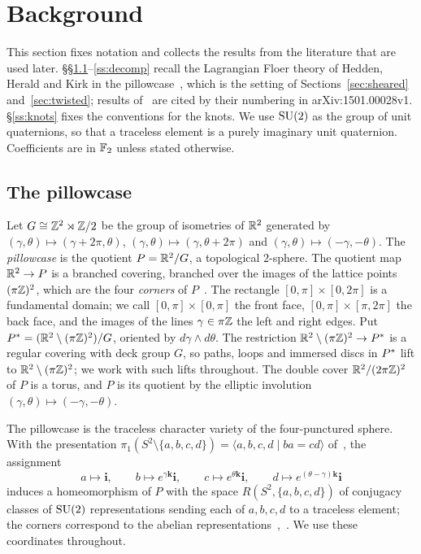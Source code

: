 \section{Background}\label{sec:background}

This section fixes notation and collects the results from the literature that are used later.
\S\S\ref{ss:pillowcase}--\ref{ss:decomp} recall the Lagrangian Floer theory of Hedden, Herald and Kirk in
the pillowcase~\cite{HHK2}, which is the setting of Sections~\ref{sec:sheared} and~\ref{sec:twisted}; results
of~\cite{HHK2} are cited by their numbering in arXiv:1501.00028v1. \S\ref{ss:knots} fixes the conventions for
the knots. We use $\mathrm{SU}(2)$ as the group of unit quaternions, so that a
traceless element is a purely imaginary unit quaternion. Coefficients are in $\mathbb{F}_2$ unless stated otherwise.

\subsection{The pillowcase}\label{ss:pillowcase}
Let $G\cong\mathbb{Z}^2\rtimes\mathbb{Z}/2$ be the group of isometries of $\mathbb{R}^2$ generated by
$(\gamma,\theta)\mapsto(\gamma+2\pi,\theta)$, $(\gamma,\theta)\mapsto(\gamma,\theta+2\pi)$ and
$(\gamma,\theta)\mapsto(-\gamma,-\theta)$. The \emph{pillowcase} is the quotient $P=\mathbb{R}^2/G$, a topological
$2$-sphere. The quotient map $\mathbb{R}^2\to P$ is a branched covering, branched over the images of the lattice points
$(\pi\mathbb{Z})^2$, which are the four \emph{corners} of $P$~\cite[\S3.1]{HHK2}. The rectangle $[0,\pi]\times[0,2\pi]$ is
a fundamental domain; we call $[0,\pi]\times[0,\pi]$ the front face, $[0,\pi]\times[\pi,2\pi]$ the back face, and
the images of the lines $\gamma\in\pi\mathbb{Z}$ the left and right edges. Put $P^{*}=(\mathbb{R}^2\setminus(\pi\mathbb{Z})^2)/G$, oriented
by $d\gamma\wedge d\theta$. The restriction $\mathbb{R}^2\setminus(\pi\mathbb{Z})^2\to P^{*}$ is a regular covering with deck group
$G$, so paths, loops and immersed discs in $P^{*}$ lift to $\mathbb{R}^2\setminus(\pi\mathbb{Z})^2$; we work with such lifts
throughout. The double cover $\mathbb{R}^2/(2\pi\mathbb{Z})^2$ of $P$ is a torus, and $P$ is its quotient by the elliptic
involution $(\gamma,\theta)\mapsto(-\gamma,-\theta)$.

The pillowcase is the traceless character variety of the four-punctured sphere. With the presentation
$\pi_1(S^2\setminus\{a,b,c,d\})=\langle a,b,c,d\mid ba=cd\rangle$ of~\cite{HHK1,HHK2}, the assignment
\begin{equation}\label{eq:hhk-coords}
a\mapsto\mathbf i,\qquad b\mapsto e^{\gamma\mathbf k}\mathbf i,\qquad c\mapsto e^{\theta\mathbf k}\mathbf i,\qquad
d\mapsto e^{(\theta-\gamma)\mathbf k}\mathbf i
\end{equation}
induces a homeomorphism of $P$ with the space $R(S^2,\{a,b,c,d\})$ of conjugacy classes of $\mathrm{SU}(2)$ representations
sending each of $a,b,c,d$ to a traceless element; the corners correspond to the abelian
representations~\cite[Prop.~3.1]{HHK1},~\cite[Prop.~6.1]{HHK2}. We use these coordinates throughout.


